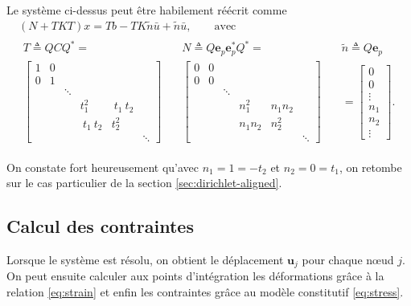 \documentclass[12pt]{article}
\begin{document}
Le système ci-dessus peut être habilement réécrit comme
\begin{gather}
    (N + T K T) x = T b - T K \tilde n \bar u + \tilde n \bar u, \qquad 
    \text{avec }\\[1em]
    \begin{array}{c|c|c}
        T \triangleq Q C Q^* = &
        N \triangleq Q \mathbf{e}_p \mathbf{e}_p^* Q^* = &
        \tilde n \triangleq Q \mathbf{e}_p\\
        \begin{bmatrix}
            1 & 0 &        &        &        & \\
            0 & 1 &        &        &        & \\
              &   & \ddots &        &        & \\
              &   &        & t_1^2  & \:t_1\:t_2 & \\
              &   &        & \:t_1\:t_2 & t_2^2  & \\
              &   &        &        &        & \ddots
        \end{bmatrix}\quad&
        \begin{bmatrix}
            0 & 0 &        &        &        & \\
            0 & 0 &        &        &        & \\
              &   & \ddots &        &        & \\
              &   &        & n_1^2  & n_1n_2 & \\
              &   &        & n_1n_2 & n_2^2  & \\
              &   &        &        &        & \ddots
        \end{bmatrix}\quad&
        =\begin{bmatrix}
            0\\
            0\\
            \vdots\\
            n_1\\
            n_2\\
            \vdots
        \end{bmatrix}.
    \end{array}
\end{gather}

On constate fort heureusement qu'avec $n_1=1=-t_2$ et $n_2=0=t_1$, on retombe sur 
le cas particulier de la section \ref{sec:dirichlet-aligned}.

\subsection{Calcul des contraintes}
Lorsque le système est résolu, on obtient le déplacement $\mathbf{u}_j$ 
pour chaque n\oe ud $j$. On peut ensuite calculer aux points d'intégration
les déformations grâce à la relation \eqref{eq:strain} et enfin les contraintes 
grâce au modèle constitutif \eqref{eq:stress}. 
\end{document}
